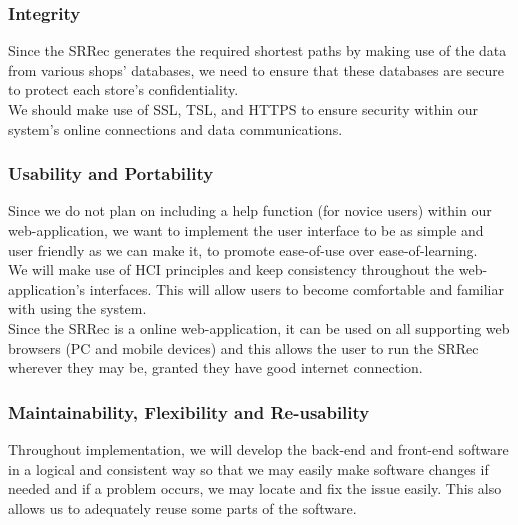 \documentclass[12pt]{article}
\begin{document}
\subsubsection{Integrity}
Since the SRRec generates the required shortest paths by making use of the data from various shops' databases, we need to ensure that these databases are secure to protect each store's confidentiality. \\
We should make use of SSL, TSL, and HTTPS to ensure security within our system's online connections and data communications.
\subsubsection{Usability and Portability}
Since we do not plan on including a help function (for novice users) within our web-application, we want to implement the user interface to be as simple and user friendly as we can make it, to promote ease-of-use over ease-of-learning.\\
We will make use of HCI principles and keep consistency throughout the web-application's interfaces. This will allow users to become comfortable and familiar with using the system.\\
Since the SRRec is a online web-application, it can be used on all supporting web browsers (PC and mobile devices) and this allows the user to run the SRRec wherever they may be, granted they have good internet connection.\\
\subsubsection{Maintainability, Flexibility and Re-usability}
Throughout implementation, we will develop the back-end and front-end software in a logical and consistent way so that we may easily make software changes if needed and if a problem occurs, we may locate and fix the issue easily. This also allows us to adequately reuse some parts of the software.
\end{document}
